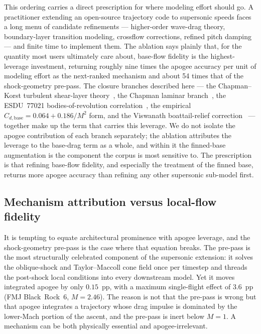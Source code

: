 This ordering carries a direct prescription for where modeling effort should go.
A practitioner extending an open-source trajectory code to supersonic speeds
faces a long menu of candidate refinements --- higher-order wave-drag theory,
boundary-layer transition modeling, crossflow corrections, refined pitch
damping --- and finite time to implement them. The ablation says plainly that,
for the quantity most users ultimately care about, base-flow fidelity is the
highest-leverage investment, returning roughly nine times the apogee accuracy per
unit of modeling effort as the next-ranked mechanism and about 54 times that of
the shock-geometry pre-pass. The closure branches described here --- the
Chapman--Korst turbulent shear-layer theory~\cite{chapman1955,chapman1958}, the
Chapman laminar branch~\cite{chapman1950}, the ESDU~77021 bodies-of-revolution
correlation~\cite{esdu77021}, the empirical $C_{d,\text{base}} = 0.064 +
0.186/M^2$ form, and the Viswanath boattail-relief
correction~\cite{viswanath1996} --- together make up the term that carries this
leverage. We do not isolate the apogee contribution of each branch separately;
the ablation attributes the leverage to the base-drag term as a whole, and within
it the finned-base augmentation is the component the corpus is most sensitive to.
The prescription is that refining base-flow fidelity, and especially the
treatment of the finned base, returns more apogee accuracy than refining any
other supersonic sub-model first.

\subsection{Mechanism attribution versus local-flow fidelity}
\label{sec:disc-prepass}

It is tempting to equate architectural prominence with apogee leverage, and the
shock-geometry pre-pass is the case where that equation breaks. The pre-pass is
the most structurally celebrated component of the supersonic extension: it solves
the oblique-shock and Taylor--Maccoll cone field once per timestep and threads the
post-shock local conditions into every downstream model. Yet it moves integrated
apogee by only $0.15$~pp, with a maximum single-flight effect of $3.6$~pp
(FMJ Black~Rock~6, $M=2.46$). The reason is not that the pre-pass is wrong but
that apogee integrates a trajectory whose drag impulse is dominated by the
lower-Mach portion of the ascent, and the pre-pass is inert below $M=1$. A
mechanism can be both physically essential and apogee-irrelevant.

